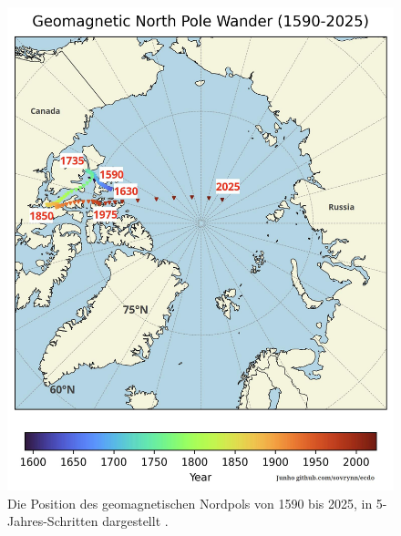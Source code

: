 \documentclass[10pt,twocolumn,letterpaper]{article}
\begin{document}
\begin{figure}[t]
\begin{center}
   \includegraphics[width=1\linewidth]{npw.jpg}
\end{center}
   \caption{Die Position des geomagnetischen Nordpols von 1590 bis 2025, in 5-Jahres-Schritten dargestellt \cite{142}.}
\label{fig:13}
\label{fig:onecol}
\end{figure}
\end{document}
